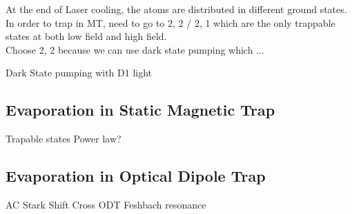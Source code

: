 At the end of Laser cooling, the atoms are distributed in different ground states.\\
In order to trap in MT, need to go to 2, 2 / 2, 1 which are the only trappable states at both low field and high field.\\
Choose 2, 2 because we can use dark state pumping which ...

Dark State pumping with D1 light

\subsection{Evaporation in Static Magnetic Trap}\label{theory:mt}
Trapable states
Power law?

\subsection{Evaporation in Optical Dipole Trap}\label{theory:odt}
AC Stark Shift
Cross ODT
Feshbach resonance
